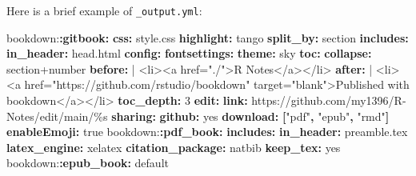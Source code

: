 \documentclass[
  a4paper,
  twoside,
  openright]{book}
\newenvironment{Shaded}{\begin{snugshade}}{\end{snugshade}}
\newcommand{\AttributeTok}[1]{\textcolor[rgb]{0.13,0.29,0.53}{#1}}
\newcommand{\CharTok}[1]{\textcolor[rgb]{0.31,0.60,0.02}{#1}}
\newcommand{\DecValTok}[1]{\textcolor[rgb]{0.00,0.00,0.81}{#1}}
\newcommand{\FunctionTok}[1]{\textcolor[rgb]{0.13,0.29,0.53}{\textbf{#1}}}
\newcommand{\KeywordTok}[1]{\textcolor[rgb]{0.13,0.29,0.53}{\textbf{#1}}}
\newcommand{\NormalTok}[1]{#1}
\newcommand{\StringTok}[1]{\textcolor[rgb]{0.31,0.60,0.02}{#1}}
\theoremstyle{definition}
\theoremstyle{definition}
\theoremstyle{definition}
\theoremstyle{definition}
\theoremstyle{remark}
\begin{document}
Here is a brief example of \texttt{\_output.yml}:

\begin{Shaded}
\begin{Highlighting}[]
\AttributeTok{bookdown:}\FunctionTok{:gitbook}\KeywordTok{:}
\AttributeTok{  }\FunctionTok{css}\KeywordTok{:}\AttributeTok{ style.css}
\AttributeTok{  }\FunctionTok{highlight}\KeywordTok{:}\AttributeTok{ tango}
\AttributeTok{  }\FunctionTok{split\_by}\KeywordTok{:}\AttributeTok{ section}
\AttributeTok{  }\FunctionTok{includes}\KeywordTok{:}
\AttributeTok{    }\FunctionTok{in\_header}\KeywordTok{:}\AttributeTok{ head.html}
\AttributeTok{  }\FunctionTok{config}\KeywordTok{:}
\AttributeTok{    }\FunctionTok{fontsettings}\KeywordTok{:}
\AttributeTok{      }\FunctionTok{theme}\KeywordTok{:}\AttributeTok{ sky}
\AttributeTok{    }\FunctionTok{toc}\KeywordTok{:}
\AttributeTok{      }\FunctionTok{collapse}\KeywordTok{:}\AttributeTok{ section+number}
\FunctionTok{      before}\KeywordTok{: }\CharTok{|}
\NormalTok{        \textless{}li\textgreater{}\textless{}a href="./"\textgreater{}R Notes\textless{}/a\textgreater{}\textless{}/li\textgreater{}}
\FunctionTok{      after}\KeywordTok{: }\CharTok{|}
\NormalTok{        \textless{}li\textgreater{}\textless{}a href="https://github.com/rstudio/bookdown" target="blank"\textgreater{}Published with bookdown\textless{}/a\textgreater{}\textless{}/li\textgreater{}}
\AttributeTok{    }\FunctionTok{toc\_depth}\KeywordTok{:}\AttributeTok{ }\DecValTok{3}
\AttributeTok{    }\FunctionTok{edit}\KeywordTok{:}\AttributeTok{ }
\AttributeTok{        }\FunctionTok{link}\KeywordTok{:}\AttributeTok{ https://github.com/my1396/R{-}Notes/edit/main/\%s}
\AttributeTok{    }\FunctionTok{sharing}\KeywordTok{:}
\AttributeTok{        }\FunctionTok{github}\KeywordTok{:}\AttributeTok{ }\CharTok{yes}
\AttributeTok{    }\FunctionTok{download}\KeywordTok{:}\AttributeTok{ }\KeywordTok{[}\StringTok{"pdf"}\KeywordTok{,}\AttributeTok{ }\StringTok{"epub"}\KeywordTok{,}\AttributeTok{ }\StringTok{"rmd"}\KeywordTok{]}
\AttributeTok{    }\FunctionTok{enableEmoji}\KeywordTok{:}\AttributeTok{ }\CharTok{true}
\AttributeTok{bookdown:}\FunctionTok{:pdf\_book}\KeywordTok{:}
\AttributeTok{  }\FunctionTok{includes}\KeywordTok{:}
\AttributeTok{    }\FunctionTok{in\_header}\KeywordTok{:}\AttributeTok{ preamble.tex}
\AttributeTok{  }\FunctionTok{latex\_engine}\KeywordTok{:}\AttributeTok{ xelatex}
\AttributeTok{  }\FunctionTok{citation\_package}\KeywordTok{:}\AttributeTok{ natbib}
\AttributeTok{  }\FunctionTok{keep\_tex}\KeywordTok{:}\AttributeTok{ }\CharTok{yes}
\AttributeTok{bookdown:}\FunctionTok{:epub\_book}\KeywordTok{:}\AttributeTok{ default}
\end{Highlighting}
\end{Shaded}
\end{document}
